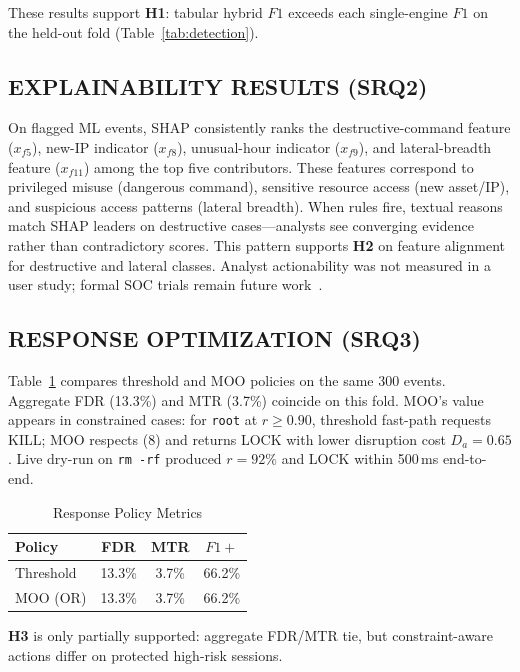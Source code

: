 \documentclass{ieeeaccess}
\begin{document}
These results support \textbf{H1}: tabular hybrid $F1$ exceeds each single-engine $F1$ on the held-out fold (Table~\ref{tab:detection}).

\subsection{EXPLAINABILITY RESULTS (SRQ2)}
On flagged ML events, SHAP consistently ranks the destructive-command feature ($x_{f5}$), new-IP indicator ($x_{f8}$), unusual-hour indicator ($x_{f9}$), and lateral-breadth feature ($x_{f11}$) among the top five contributors. These features correspond to privileged misuse (dangerous command), sensitive resource access (new asset/IP), and suspicious access patterns (lateral breadth). When rules fire, textual reasons match SHAP leaders on destructive cases---analysts see converging evidence rather than contradictory scores. This pattern supports \textbf{H2} on feature alignment for destructive and lateral classes. Analyst actionability was not measured in a user study; formal SOC trials remain future work~\cite{ref25}.

\subsection{RESPONSE OPTIMIZATION (SRQ3)}
Table~\ref{tab:policy} compares threshold and MOO policies on the same 300 events. Aggregate FDR (13.3\%) and MTR (3.7\%) coincide on this fold. MOO's value appears in constrained cases: for \texttt{root} at $r\geq 0.90$, threshold fast-path requests KILL; MOO respects (8) and returns LOCK with lower disruption cost $D_a{=}0.65$. Live dry-run on \texttt{rm -rf} produced $r=92\%$ and LOCK within 500\,ms end-to-end.

\begin{table}[!t]
\caption{Response Policy Metrics}
\label{tab:policy}
\centering
\scriptsize
\begin{tabular}{@{}lccc@{}}
\toprule
\textbf{Policy} & \textbf{FDR} & \textbf{MTR} & \textbf{$F1+$} \\
\midrule
Threshold & 13.3\% & 3.7\% & 66.2\% \\
MOO (OR) & 13.3\% & 3.7\% & 66.2\% \\
\bottomrule
\end{tabular}
\end{table}

\textbf{H3} is only partially supported: aggregate FDR/MTR tie, but constraint-aware actions differ on protected high-risk sessions.
\end{document}
